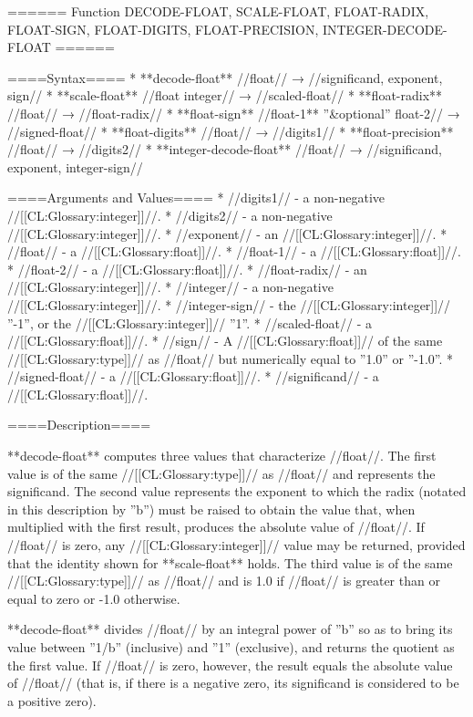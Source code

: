 ====== Function DECODE-FLOAT, SCALE-FLOAT, FLOAT-RADIX, FLOAT-SIGN, FLOAT-DIGITS, FLOAT-PRECISION, INTEGER-DECODE-FLOAT ======

====Syntax====
  * **decode-float** //float// → //significand, exponent, sign//
  * **scale-float** //float integer// → //scaled-float//
  * **float-radix** //float// → //float-radix//
  * **float-sign** //float-1** ''&optional'' float-2// → //signed-float//
  * **float-digits** //float// → //digits1//
  * **float-precision** //float// → //digits2//
  * **integer-decode-float** //float// → //significand, exponent, integer-sign//

====Arguments and Values====
  * //digits1// - a non-negative //[[CL:Glossary:integer]]//.
  * //digits2// - a non-negative //[[CL:Glossary:integer]]//.
  * //exponent// - an //[[CL:Glossary:integer]]//.
  * //float// - a //[[CL:Glossary:float]]//.
  * //float-1// - a //[[CL:Glossary:float]]//.
  * //float-2// - a //[[CL:Glossary:float]]//.
  * //float-radix// - an //[[CL:Glossary:integer]]//.
  * //integer// - a non-negative //[[CL:Glossary:integer]]//.
  * //integer-sign// - the //[[CL:Glossary:integer]]// ''-1'', or the //[[CL:Glossary:integer]]// ''1''.
  * //scaled-float// - a //[[CL:Glossary:float]]//.
  * //sign// - A //[[CL:Glossary:float]]// of the same //[[CL:Glossary:type]]// as //float// but numerically equal to ''1.0'' or ''-1.0''.
  * //signed-float// - a //[[CL:Glossary:float]]//.
  * //significand// - a //[[CL:Glossary:float]]//.

====Description====

**decode-float** computes three values that characterize //float//. The first value is of the same //[[CL:Glossary:type]]// as //float// and represents the significand. The second value represents the exponent to which the radix (notated in this description by ''b'') must be raised to obtain the value that, when multiplied with the first result, produces the absolute value of //float//. If //float// is zero, any //[[CL:Glossary:integer]]// value may be returned, provided that the identity shown for **scale-float** holds. The third value is of the same //[[CL:Glossary:type]]// as //float// and is 1.0 if //float// is greater than or equal to zero or -1.0 otherwise.

**decode-float** divides //float// by an integral power of ''b'' so as to bring its value between ''1/b'' (inclusive) and ''1'' (exclusive), and returns the quotient as the first value. If //float// is zero, however, the result equals the absolute value of //float// (that is, if there is a negative zero, its significand is considered to be a positive zero).

